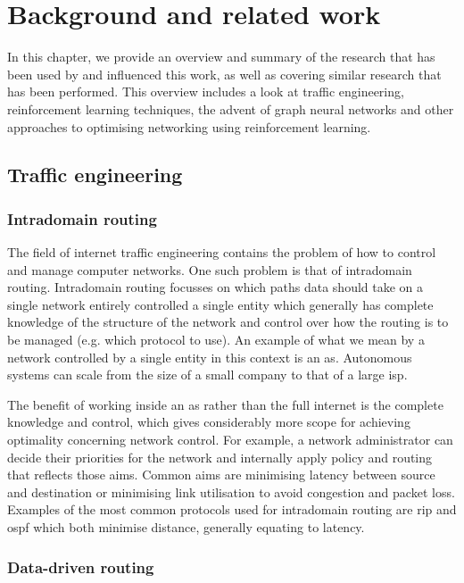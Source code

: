 \chapter{Background and related work}
\label{chapter:background}

In this chapter, we provide an overview and summary of the research that has been used by and influenced this work, as well as covering similar research that has been performed. This overview includes a look at traffic engineering, reinforcement learning techniques, the advent of graph neural networks and other approaches to optimising networking using reinforcement learning.


\section{Traffic engineering}

\subsection{Intradomain routing}

The field of internet traffic engineering contains the problem of how to control and manage computer networks. One such problem is that of intradomain routing. Intradomain routing focusses on which paths data should take on a single network entirely controlled a single entity which generally has complete knowledge of the structure of the network and control over how the routing is to be managed (e.g. which protocol to use). An example of what we mean by a network controlled by a single entity in this context is an \ac{as}. Autonomous systems can scale from the size of a small company to that of a large \ac{isp}.

The benefit of working inside an \ac{as} rather than the full internet is the complete knowledge and control, which gives considerably more scope for achieving optimality concerning network control. For example, a network administrator can decide their priorities for the network and internally apply policy and routing that reflects those aims. Common aims are minimising latency between source and destination or minimising link utilisation to avoid congestion and packet loss. Examples of the most common protocols used for intradomain routing are \ac{rip}\cite{rfc2080} and \ac{ospf}\cite{rfc5340} which both minimise distance, generally equating to latency.

\subsection{Data-driven routing}

